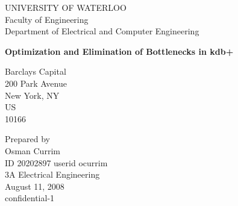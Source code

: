 \begin{titlepage}

	\begin{center} \Large
		UNIVERSITY OF WATERLOO\\
		Faculty of Engineering\\
		Department of Electrical and Computer Engineering
	\end{center}
	
	\vspace{1.2in}
	
	\begin{center} \large
		\textbf{Optimization and Elimination of Bottlenecks in kdb+}
	\end{center}
	
	\vfill
	
	\begin{center}
		Barclays Capital\\
		200 Park Avenue\\
		New York, NY\\
		US\\
		10166
	\end{center}
	
	\vspace{0.5in}
	
	\begin{center}
		Prepared by\\
		Osman Currim\\
		ID 20202897 \textbar userid ocurrim\\
		3A Electrical Engineering\\
		August 11, 2008\\
		confidential-1
	\end{center}
	
\end{titlepage}